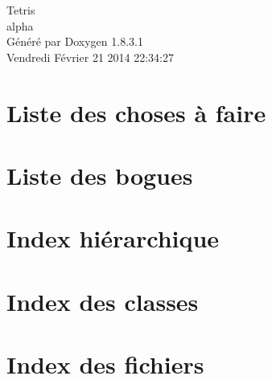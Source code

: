 \documentclass{book}
\begin{document}
\hypersetup{pageanchor=false,citecolor=blue}
\begin{titlepage}
\vspace*{7cm}
\begin{center}
{\Large Tetris \\[1ex]\large alpha }\\
\vspace*{1cm}
{\large Généré par Doxygen 1.8.3.1}\\
\vspace*{0.5cm}
{\small Vendredi Février 21 2014 22:34:27}\\
\end{center}
\end{titlepage}
\clearemptydoublepage
{}
\tableofcontents
\clearemptydoublepage
{}
\hypersetup{pageanchor=true,citecolor=blue}
\chapter{Liste des choses à faire}
\label{todo}
\hypertarget{todo}{}

\chapter{Liste des bogues}
\label{bug}
\hypertarget{bug}{}

\chapter{Index hiérarchique}

\chapter{Index des classes}

\chapter{Index des fichiers}

\end{document}
